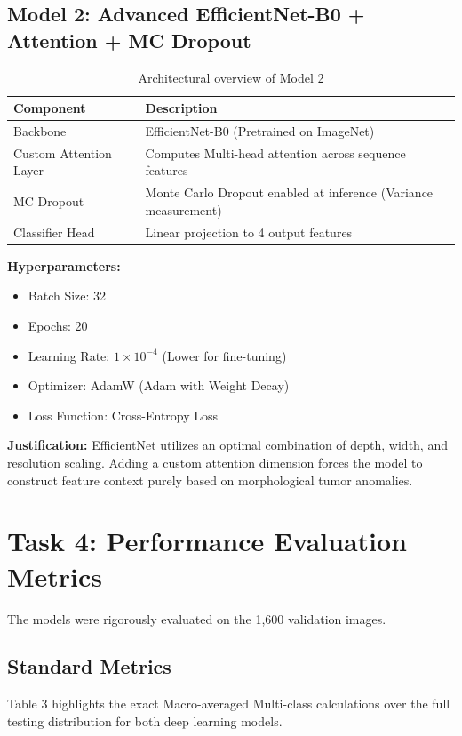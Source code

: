 \documentclass[12pt, a4paper]{article}
\begin{document}
\subsection*{Model 2: Advanced EfficientNet-B0 + Attention + MC Dropout}

\begin{table}[H]
    \centering
    \begin{tabular}{|l|l|}
    \hline
    \textbf{Component} & \textbf{Description} \\ \hline
    Backbone & EfficientNet-B0 (Pretrained on ImageNet) \\ \hline
    Custom Attention Layer & Computes Multi-head attention across sequence features \\ \hline
    MC Dropout & Monte Carlo Dropout enabled at inference (Variance measurement) \\ \hline
    Classifier Head & Linear projection to 4 output features \\ \hline
    \end{tabular}
    \caption{Architectural overview of Model 2}
\end{table}

\noindent
\textbf{Hyperparameters:}
\begin{itemize}
    \item Batch Size: 32
    \item Epochs: 20
    \item Learning Rate: $1 \times 10^{-4}$ (Lower for fine-tuning)
    \item Optimizer: AdamW (Adam with Weight Decay)
    \item Loss Function: Cross-Entropy Loss
\end{itemize}
\textbf{Justification:} EfficientNet utilizes an optimal combination of depth, width, and resolution scaling. Adding a custom attention dimension forces the model to construct feature context purely based on morphological tumor anomalies.


\section*{Task 4: Performance Evaluation Metrics}

The models were rigorously evaluated on the 1,600 validation images. 

\subsection*{Standard Metrics}
Table 3 highlights the exact Macro-averaged Multi-class calculations over the full testing distribution for both deep learning models.
\end{document}
